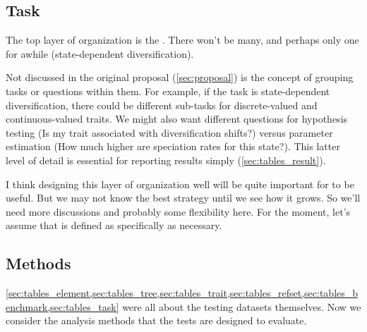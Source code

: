 \subsection{Task}
\label{sec:tables_task}

The top layer of organization is the \Task.
There won't be many, and perhaps only one for awhile (\ie state-dependent diversification).

Not discussed in the original proposal (\cref{sec:proposal}) is the concept of grouping tasks or questions within them.
For example, if the task is state-dependent diversification, there could be different sub-tasks for discrete-valued and continuous-valued traits.
We might also want different questions for hypothesis testing (Is my trait associated with diversification shifts?) versus parameter estimation (How much higher are speciation rates for this state?).
This latter level of detail is essential for reporting results simply (\cref{sec:tables_result}).

I think designing this layer of organization well will be quite important for \phycomb to be useful.
But we may not know the best strategy until we see how it grows.
So we'll need more discussions and probably some flexibility here.
For the moment, let's assume that \Task is defined as specifically as necessary.

\subsection{Methods}
\label{sec:tables_method}

\cref{sec:tables_element,sec:tables_tree,sec:tables_trait,sec:tables_refset,sec:tables_benchmark,sec:tables_task} were all about the testing datasets themselves.
Now we consider the analysis methods that the tests are designed to evaluate.

